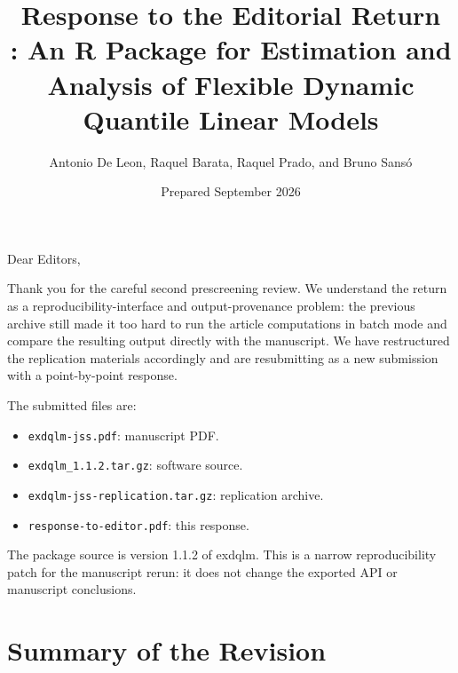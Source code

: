\documentclass[11pt,letterpaper]{article}
\title{\textbf{Response to the Editorial Return}\\
\pkg{exdqlm}: An R Package for Estimation and Analysis of Flexible Dynamic Quantile Linear Models}
\author{Antonio De Leon, Raquel Barata, Raquel Prado, and Bruno Sans\'o}
\date{Prepared September 2026}
\newcommand{\pkg}[1]{\textsf{#1}}
\newcommand{\code}[1]{\texttt{#1}}
\begin{document}
\maketitle

Dear Editors,

Thank you for the careful second prescreening review. We understand the return
as a reproducibility-interface and output-provenance problem: the previous
archive still made it too hard to run the article computations in batch mode and
compare the resulting output directly with the manuscript. We have restructured
the replication materials accordingly and are resubmitting as a new submission
with a point-by-point response.

The submitted files are:
\begin{itemize}
\item \code{exdqlm-jss.pdf}: manuscript PDF.
\item \code{exdqlm\_1.1.2.tar.gz}: software source.
\item \code{exdqlm-jss-replication.tar.gz}: replication archive.
\item \code{response-to-editor.pdf}: this response.
\end{itemize}

The package source is version 1.1.2 of \pkg{exdqlm}. This is a narrow
reproducibility patch for the manuscript rerun: it does not change the exported
API or manuscript conclusions.

\section*{Summary of the Revision}
\end{document}
